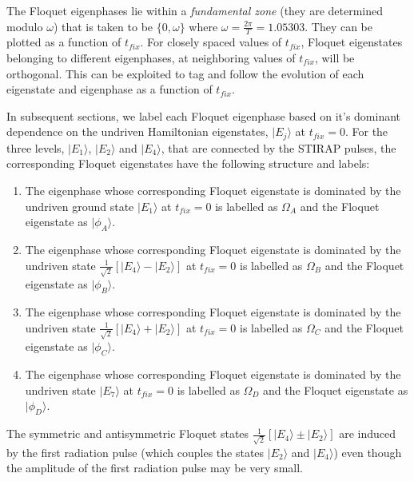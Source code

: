 \documentclass{article}
\begin{document}
The Floquet eigenphases lie within a {\it fundamental zone} (they are determined modulo $\omega$)   that is  taken to be $\lbrace 0,\omega\rbrace$ where $\omega=\frac{2\pi}{T}=1.05303$.  They can be plotted as a function of $t_{fix}$. For closely spaced values of $t_{fix}$, Floquet eigenstates belonging to different eigenphases, at neighboring values of $t_{fix}$,  will be orthogonal. This can be exploited to tag and follow the evolution of each eigenstate and eigenphase as a function of $t_{fix}$. 

In subsequent sections, we label each Floquet eigenphase based on it's dominant dependence on the undriven Hamiltonian eigenstates, $|E_j{\rangle}$  at $t_{fix}=0$. For the three levels, $|E_1{\rangle}$,  $|E_2{\rangle}$ and $|E_4{\rangle}$,  that are connected by the STIRAP pulses, the corresponding Floquet eigenstates have the following structure and labels:
%
\begin{enumerate}
\item 
The eigenphase whose corresponding Floquet eigenstate is dominated by the undriven ground state $|E_1{\rangle}$  at $t_{fix}=0$ is labelled as $\Omega_A$ and the Floquet eigenstate as $|\phi_A\rangle$.

\item
The eigenphase whose corresponding Floquet eigenstate is dominated by the undriven state $\frac{1}{\sqrt{2}}\left[|E_4\rangle - |E_2\rangle \right]$ at $t_{fix}=0$ is labelled as $\Omega_B$ and the Floquet eigenstate as $|\phi_B\rangle$.

\item
The eigenphase whose corresponding Floquet eigenstate is dominated by the undriven state $\frac{1}{\sqrt{2}}\left[|E_4\rangle + |E_2\rangle \right]$ at $t_{fix}=0$  is labelled as $\Omega_C$ and the Floquet eigenstate as $|\phi_C\rangle$.

\item
The eigenphase whose corresponding Floquet eigenstate is dominated by the undriven  state $|E_7{\rangle}$  at $t_{fix}=0$ is labelled as $\Omega_D$ and the Floquet eigenstate as $|\phi_D\rangle$.

\end{enumerate}
%
The symmetric and antisymmetric Floquet states  $\frac{1}{\sqrt{2}}\left[|E_4\rangle {\pm} |E_2\rangle \right]$  are induced by the first radiation pulse (which couples the states $|E_2{\rangle}$ and $|E_4{\rangle}$) even though the amplitude of the first radiation pulse may be very small. 
\end{document}
